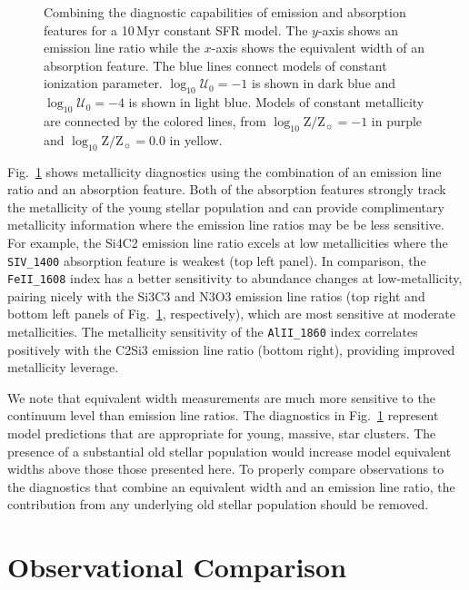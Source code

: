 \documentclass[preprint2,trackchanges]{aastex62}
\newcommand{\Myr}{$\,$Myr\xspace}
\newcommand{\logten}{\ensuremath{\log_{10}}}
\newcommand{\logZeq}[1]{\ensuremath{\logten \mathrm{Z}/\mathrm{Z}_{\sun} = #1}}
\newcommand{\logUeq}[1]{\ensuremath{\logten \mathcal{U}_0 = #1}}
\begin{document}
\begin{figure}
\begin{center}
    \caption{Combining the diagnostic capabilities of emission and absorption features for a 10\Myr constant SFR model. The $y$-axis shows an emission line ratio while the $x$-axis shows the equivalent width of an absorption feature. The blue lines connect models of constant ionization parameter. \logUeq{-1} is shown in dark blue and \logUeq{-4} is shown in light blue. Models of constant metallicity are connected by the colored lines, from \logZeq{-1} in purple and \logZeq{0.0} in yellow.}
    \label{fig:AbsEm}
  \end{center}
\end{figure}


Fig.~\ref{fig:AbsEm} shows metallicity diagnostics using the combination of an emission line ratio and an absorption feature. Both of the absorption features strongly track the metallicity of the young stellar population and can provide complimentary metallicity information where the emission line ratios may be be less sensitive. For example, the Si4C2 emission line ratio excels at low metallicities where the \texttt{SIV\_1400} absorption feature is weakest (top left panel). In comparison, the \texttt{FeII\_1608} index has a better sensitivity to abundance changes at low-metallicity, pairing nicely with the Si3C3 and N3O3 emission line ratios (top right and bottom left panels of Fig.~\ref{fig:AbsEm}, respectively), which are most sensitive at moderate metallicities. The metallicity sensitivity of the \texttt{AlII\_1860} index correlates positively with the C2Si3 emission line ratio (bottom right), providing improved metallicity leverage.

We note that equivalent width measurements are much more sensitive to the continuum level than emission line ratios. The diagnostics in Fig.~\ref{fig:AbsEm} represent model predictions that are appropriate for young, massive, star clusters. The presence of a substantial old stellar population would increase model equivalent widths above those those presented here. To properly compare observations to the diagnostics that combine an equivalent width and an emission line ratio, the contribution from any underlying old stellar population should be removed.

\section{Observational Comparison} \label{sec:obs}
\end{document}
